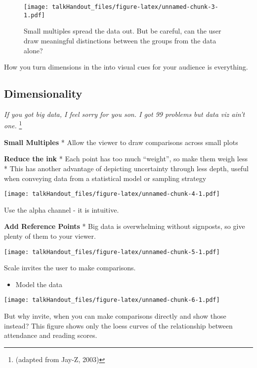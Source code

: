 \documentclass{tufte-handout}
\begin{document}
\begin{figure*}
 \texttt{[image: talkHandout\_files/figure-latex/unnamed-chunk-3-1.pdf]}
\caption{Small multiples spread the data out. But be careful, can the user draw meaningful distinctions between the groups from the data alone?}
\end{figure*}

How you turn dimensions in the into visual cues for your audience is
everything.

\subsection{Dimensionality}\label{dimensionality}

\emph{If you got big data, I feel sorry for you son. I got 99 problems
but data viz ain't one.} \footnote{(adapted from Jay-Z, 2003)}

\textbf{Small Multiples} * Allow the viewer to draw comparisons across
small plots

\textbf{Reduce the ink} * Each point has too much ``weight'', so make
them weigh less * This has another advantage of depicting uncertainty
through less depth, useful when conveying data from a statistical model
or sampling strategy

\begin{marginfigure}
 \texttt{[image: talkHandout\_files/figure-latex/unnamed-chunk-4-1.pdf]}
\caption{Use the alpha channel - it is intuitive.}
\end{marginfigure}

\textbf{Add Reference Points} * Big data is overwhelming without
signposts, so give plenty of them to your viewer.

\begin{marginfigure}
 \texttt{[image: talkHandout\_files/figure-latex/unnamed-chunk-5-1.pdf]}
\caption{Scale invites the user to make comparisons.}
\end{marginfigure}

\begin{itemize}
\itemsep1pt\parskip0pt
\item
  Model the data
\end{itemize}

\begin{marginfigure}
 \texttt{[image: talkHandout\_files/figure-latex/unnamed-chunk-6-1.pdf]}
\caption{But why invite, when you can make comparisons directly and show those instead? This figure shows only the loess curves of the relationship between attendance and reading scores.}
\end{marginfigure}
\end{document}
